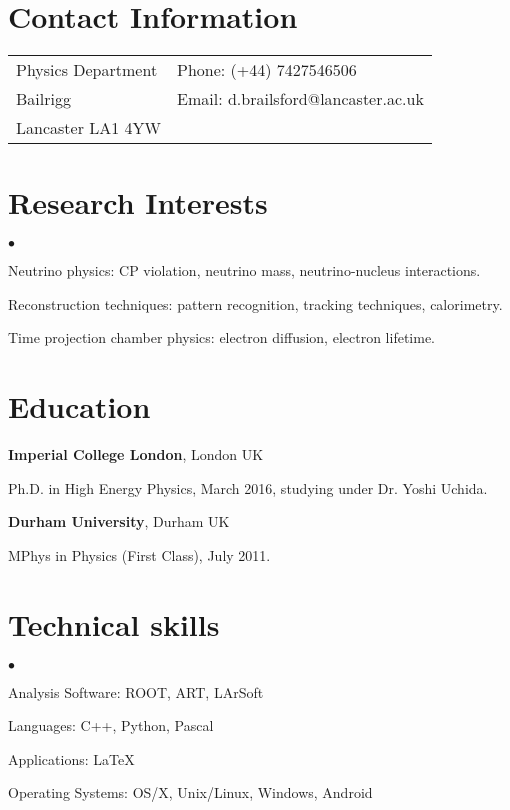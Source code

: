 \documentclass[margin,line]{res}
\newenvironment{list1}{
  \begin{list}{\ding{113}}{%
      \setlength{\itemsep}{0in}
      \setlength{\parsep}{0in} \setlength{\parskip}{0in}
      \setlength{\topsep}{0in} \setlength{\partopsep}{0in} 
      \setlength{\leftmargin}{0.17in}}}{\end{list}}
\newenvironment{list2}{
  \begin{list}{$\bullet$}{%
      \setlength{\itemsep}{0in}
      \setlength{\parsep}{0in} \setlength{\parskip}{0in}
      \setlength{\topsep}{0in} \setlength{\partopsep}{0in} 
      \setlength{\leftmargin}{0.2in}}}{\end{list}}
\begin{document}

\begin{resume}
\section{\sc Contact Information}
\vspace{.05in}
\begin{tabular}{@{}p{2in}p{4in}}
Physics Department           & { Phone:}  (+44) 7427546506\\
Bailrigg   & { Email:}    d.brailsford@lancaster.ac.uk \\      
Lancaster  LA1 4YW & \\   
\end{tabular}


\section{\sc Research Interests}
\begin{list2}
\item Neutrino physics: CP violation, neutrino mass, neutrino-nucleus interactions.
\item Reconstruction techniques: pattern recognition, tracking techniques, calorimetry.
\item Time projection chamber physics: electron diffusion, electron lifetime. 
\end{list2}

\section{\sc Education}
{\bf Imperial College London}, London UK\\
\vspace*{-.1in}
\begin{list1}
\item[] Ph.D. in High Energy Physics, March 2016, studying under Dr. Yoshi Uchida.
\end{list1}

{\bf Durham University}, Durham UK\\
\vspace*{-.1in}
\begin{list1}
\item[] MPhys in Physics (First Class), July 2011.
\end{list1}


\section{\sc Technical skills} 
\begin{list2}
\item Analysis Software: ROOT, ART, LArSoft
\item Languages: C++, Python, Pascal
\item Applications:  \LaTeX
\item Operating Systems:  OS/X, Unix/Linux, Windows, Android
\end{list2}




\end{resume}
\end{document}
